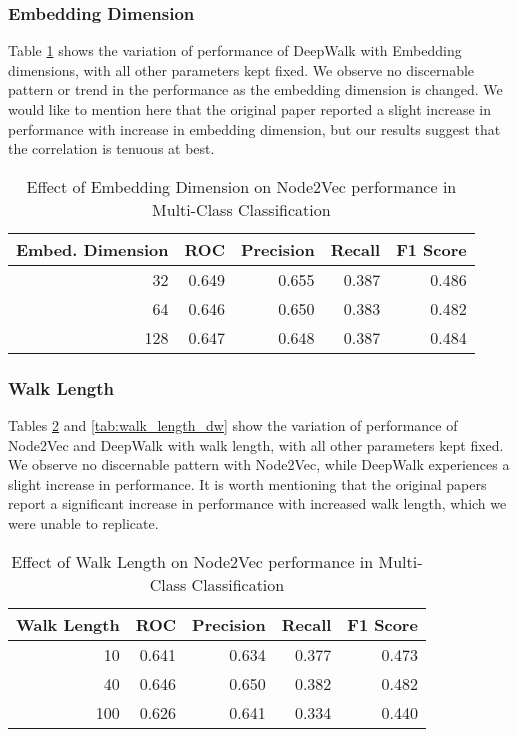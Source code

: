 \documentclass[sigconf]{acmart}
\begin{document}
\subsubsection{Embedding Dimension}
Table \ref{tab:embed_dim} shows the variation of performance of DeepWalk with Embedding dimensions, with all other parameters kept fixed. We observe no discernable pattern or trend in the performance as the embedding dimension is changed. We would like to mention here that the original paper reported a slight increase in performance with increase in embedding dimension, but our results suggest that the correlation is tenuous at best.
\begin{table}[H]
\begin{tabular}{|r|r|r|r|r|}
\hline
\textbf{Embed. Dimension} & \textbf{ROC} & \textbf{Precision} & \textbf{Recall} & \textbf{F1 Score}\\
\hline
32 & 0.649 & 0.655 & 0.387 & 0.486\\
64 & 0.646 & 0.650 & 0.383 & 0.482\\
128 & 0.647 & 0.648 & 0.387 & 0.484\\
\hline
\end{tabular}

\caption{Effect of Embedding Dimension on Node2Vec performance in Multi-Class Classification}
\label{tab:embed_dim}
\end{table}


\subsubsection{Walk Length}
Tables \ref{tab:walk_length_n2v} and 
\ref{tab:walk_length_dw} show the variation of performance of Node2Vec and DeepWalk with walk length, with all other parameters kept fixed. We observe no discernable pattern with Node2Vec, while DeepWalk experiences a slight increase in performance. It is worth mentioning that the original papers report a significant increase in performance with increased walk length, which we were unable to replicate.

\begin{table}[H]
\begin{tabular}{|r|r|r|r|r|}
\hline
\textbf{Walk Length} & \textbf{ROC} & \textbf{Precision} & \textbf{Recall} & \textbf{F1 Score}\\
\hline
10 & 0.641 & 0.634 & 0.377 & 0.473\\
40 & 0.646 & 0.650 & 0.382 & 0.482\\
100 & 0.626 & 0.641 & 0.334 & 0.440\\
\hline
\end{tabular}
\caption{Effect of Walk Length on Node2Vec performance in Multi-Class Classification}
\label{tab:walk_length_n2v}
\end{table}
\end{document}
